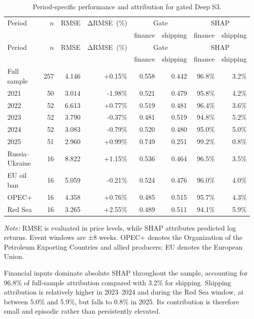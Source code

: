 \documentclass[
  british,
  12pt,
  oneside]{book}
\newcommand{\DRMSE}{ΔRMSE}
\begin{document}
\begin{longtable}{@{}lrrrrrrr@{}}
\caption{\label{tab:period-attr} Period-specific performance and attribution for gated Deep S3.}\\
\toprule
Period & $n$ & RMSE & \mbox{\DRMSE{} (\%)} & \multicolumn{2}{c}{Gate} & \multicolumn{2}{c}{SHAP} \\
\cmidrule(lr){5-6} \cmidrule(lr){7-8}
 & & & & finance & shipping & finance & shipping \\
\midrule
\endfirsthead
\toprule
Period & $n$ & RMSE & \mbox{\DRMSE{} (\%)} & \multicolumn{2}{c}{Gate} & \multicolumn{2}{c}{SHAP} \\
\cmidrule(lr){5-6} \cmidrule(lr){7-8}
 & & & & finance & shipping & finance & shipping \\
\midrule
\endhead
\bottomrule
\endlastfoot
Full sample & 257 & 4.146 & +0.15\% & 0.558 & 0.442 & 96.8\% & 3.2\% \\
2021 & 50 & 3.014 & -1.98\% & 0.521 & 0.479 & 95.8\% & 4.2\% \\
2022 & 52 & 6.613 & +0.77\% & 0.519 & 0.481 & 96.4\% & 3.6\% \\
2023 & 52 & 3.790 & -0.37\% & 0.481 & 0.519 & 94.8\% & 5.2\% \\
2024 & 52 & 3.083 & -0.79\% & 0.520 & 0.480 & 95.0\% & 5.0\% \\
2025 & 51 & 2.960 & +0.99\% & 0.749 & 0.251 & 99.2\% & 0.8\% \\
Russia--Ukraine & 16 & 8.822 & +1.15\% & 0.536 & 0.464 & 96.5\% & 3.5\% \\
EU oil ban & 16 & 5.059 & -0.21\% & 0.524 & 0.476 & 96.0\% & 4.0\% \\
OPEC+ & 16 & 4.358 & +0.76\% & 0.485 & 0.515 & 95.7\% & 4.3\% \\
Red Sea & 16 & 3.265 & +2.55\% & 0.489 & 0.511 & 94.1\% & 5.9\% \\
\end{longtable}

\emph{Note:} RMSE is evaluated in price levels, while SHAP attributes predicted log returns. Event windows are ±8 weeks. OPEC+ denotes the Organization of the Petroleum Exporting Countries and allied producers; EU denotes the European Union.

Financial inputs dominate absolute SHAP throughout the sample, accounting for 96.8\% of full-sample attribution compared with 3.2\% for shipping. Shipping attribution is relatively higher in 2023--2024 and during the Red Sea window, at between 5.0\% and 5.9\%, but falls to 0.8\% in 2025. Its contribution is therefore small and episodic rather than persistently elevated.
\end{document}
